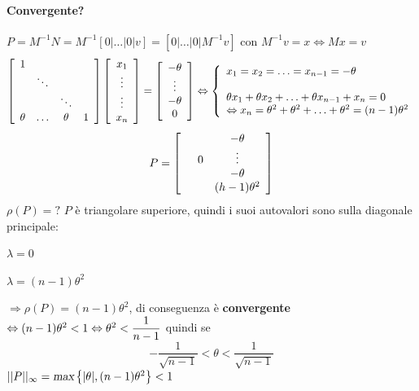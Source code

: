 \documentclass[10pt]{book}
\begin{document}
\paragraph{Convergente?} $P = M^{-1}N = M^{-1}\left[0|\ldots|0|v\right] = \left[0|\ldots|0|M^{-1}v\right]$ con $M^{-1}v = x \Leftrightarrow Mx = v$
$$\left[\begin{array}{c c c c}
1 & & &\\
& \ddots & &\\
& & \ddots &\\
\theta & \ldots & \theta & 1
\end{array} \right] \left[ \begin{array}{c}
x_1\\\vdots\\\vdots\\x_n
\end{array}\right] = \left[ \begin{array}{c}
-\theta\\\vdots\\-\theta\\0
\end{array}\right] \Leftrightarrow \left\{\begin{array}{l}
x_1 = x_2 = \ldots = x_{n-1} = -\theta\\
\\
\theta x_1 + \theta x_2 + \ldots + \theta x_{n-1} + x_n = 0\\
\Leftrightarrow x_n = \theta^2 + \theta^2 + \ldots + \theta^2 = (n-1)\theta^2
\end{array}\right.$$
$$P = \left[ \begin{array}{c c c}
& & -\theta\\
& 0 & \vdots\\
& & -\theta\\
& & (h-1)\theta^2
\end{array} \right]$$
$\rho(P) = ?$ $P$ è triangolare superiore, quindi i suoi autovalori sono sulla diagonale principale:
\begin{list}{}{}
	\item $\lambda = 0$
	\item $\lambda = (n-1)\theta^2$
\end{list}
$\Rightarrow \rho(P) = (n-1)\theta^2$, di conseguenza è \textbf{convergente} $\Leftrightarrow (n-1)\theta^2 < 1 \Leftrightarrow \theta^2 < \mathlarger{\frac{1}{n-1}}$ quindi se $$-\frac{1}{\sqrt{n-1}} < \theta < \frac{1}{\sqrt{n-1}}$$
$||P||_\infty = \textsl{max}\left\{|\theta|, (n-1)\theta^2\right\} < 1$
\end{document}

